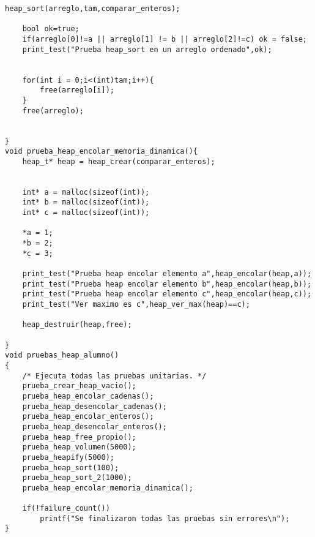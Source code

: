 \documentclass[11pt,a4paper]{article}
\begin{document}
\begin{lstlisting}[style= c]
	heap_sort(arreglo,tam,comparar_enteros);

	bool ok=true;
	if(arreglo[0]!=a || arreglo[1] != b || arreglo[2]!=c) ok = false;
	print_test("Prueba heap_sort en un arreglo ordenado",ok);
	

	for(int i = 0;i<(int)tam;i++){
		free(arreglo[i]);
	}
	free(arreglo);


}
void prueba_heap_encolar_memoria_dinamica(){
	heap_t* heap = heap_crear(comparar_enteros);

	
	int* a = malloc(sizeof(int));
	int* b = malloc(sizeof(int));
	int* c = malloc(sizeof(int));

	*a = 1;
	*b = 2;
	*c = 3;
	
	print_test("Prueba heap encolar elemento a",heap_encolar(heap,a));
	print_test("Prueba heap encolar elemento b",heap_encolar(heap,b));
	print_test("Prueba heap encolar elemento c",heap_encolar(heap,c));
	print_test("Ver maximo es c",heap_ver_max(heap)==c);

	heap_destruir(heap,free);

}
void pruebas_heap_alumno()
{
    /* Ejecuta todas las pruebas unitarias. */
    prueba_crear_heap_vacio();
    prueba_heap_encolar_cadenas();
    prueba_heap_desencolar_cadenas();
    prueba_heap_encolar_enteros();
    prueba_heap_desencolar_enteros();
    prueba_heap_free_propio();
    prueba_heap_volumen(5000);
    prueba_heapify(5000);
    prueba_heap_sort(100);
    prueba_heap_sort_2(1000);
   	prueba_heap_encolar_memoria_dinamica();

    if(!failure_count())
        printf("Se finalizaron todas las pruebas sin errores\n");
}

\end{lstlisting}
\end{document}
